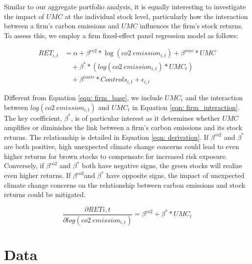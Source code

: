 \documentclass[12pt]{article}
\begin{document}
Similar to our aggregate portfolio analysis, it is equally interesting to investigate the impact of $UMC$ at the individual stock level, particularly how the interaction between a firm's carbon emissions and $UMC$ influences the firm's stock returns. To assess this, we employ a firm fixed-effect panel regression model as follows:

\begin{align}
    \label{eqn: firm_interaction}
    RET_{i, t} &= \alpha + \beta^{co2}*\log(co2 \: emission_{i, t}) + \beta^{umc}*UMC \nonumber \\
               &\quad + \beta^* *(log(co2 \: emission_{i, t})*UMC_{t}) \nonumber \\
               &\quad + \beta^{contr}*Controls_{i, t} + \epsilon_{i, t}
\end{align}

\noindent Different from Equation \ref{eqn: firm_base}, we include $UMC_{t}$ and the interaction between $log(co2 \: emission_{i, t})$ and $UMC_t$ in Equation \ref{eqn: firm_interaction}. The key coefficient, $\beta^*$, is of particular interest as it determines whether $UMC$ amplifies or diminishes the link between a firm's carbon emissions and its stock returns. The relationship is detailed in Equation \ref{eqn: derivation}. If $\beta^{co2}$ and $\beta^{*}$ are both positive, high unexpected climate change concerns could lead to even higher returns for brown stocks to compensate for increased risk exposure. Conversely, if $\beta^{co2}$ and $\beta^{*}$ both have negative signs, the green stocks will realize even higher returns. If $\beta^{co2}$and $\beta^{*}$ have opposite signs, the impact of unexpected climate change concerns on the relationship between carbon emissions and stock returns could be mitigated.

\begin{equation}
\label{eqn: derivation}
\frac{\partial RET{i, t}}{\partial log(co2 \: emission_{i, t})} = \beta^{co2} + \beta^{*}*UMC_{t}
\end{equation}
\section{Data} \label{sec: data}
\end{document}
